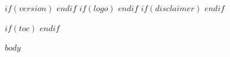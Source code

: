 \documentclass[$if(fontsize)$$fontsize$$else$11pt$endif$]{article}
\begin{document}
\newcommand{\doctitle}{$title$}
\newcommand{\docauthor}{$author$}
\newcommand{\docdate}{$date$}
$if(version)$
\newcommand{\docversion}{$version$}
$endif$
$if(logo)$
\newcommand{\doclogo}{$logo$}
$endif$
$if(disclaimer)$
\newcommand{\docdisclaimer}{$disclaimer$}
$endif$


$if(toc)$
\renewcommand{\contentsname}{Table of Contents}
\setcounter{tocdepth}{$if(toc-depth)$$toc-depth$$else$3$endif$}
\tableofcontents
\newpage
$endif$

$body$
\end{document}
